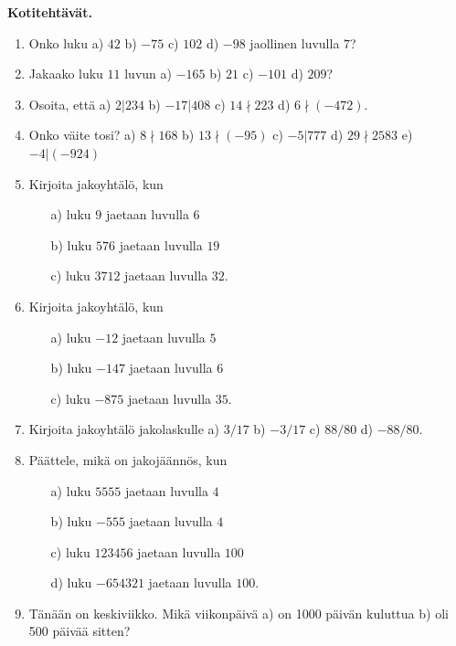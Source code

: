 {\bf Kotitehtävät.}

\begin{enumerate}

\item Onko luku a) $42$ b) $-75$ c) $102$ d) $-98$ jaollinen luvulla $7$?

\item Jakaako luku $11$ luvun a) $-165$ b) $21$ c) $-101$ d) $209$?

\item Osoita, että a) $2|234$ b) $-17|408$ c) $14 \nmid 223$ d) $6 \nmid (-472)$.

\item Onko väite tosi? a) $8 \nmid 168$ b) $13 \nmid (-95)$ c) $-5|777$ d) $29\nmid 2583$ e) $-4|(-924)$

\item Kirjoita jakoyhtälö, kun
\begin{itemize}
\item[a)] luku $9$ jaetaan luvulla $6$
\item[b)] luku $576$ jaetaan luvulla $19$
\item[c)] luku $3712$ jaetaan luvulla $32$.
\end{itemize}

\item Kirjoita jakoyhtälö, kun
\begin{itemize}
\item[a)] luku $-12$ jaetaan luvulla $5$
\item[b)] luku $-147$ jaetaan luvulla $6$
\item[c)] luku $-875$ jaetaan luvulla $35$.
\end{itemize}

\item Kirjoita jakoyhtälö jakolaskulle a) $3/17$ b) $-3/17$ c) $88/80$ d) $-88/80$.

\item Päättele, mikä on jakojäännös, kun
\begin{itemize}
\item[a)] luku $5555$ jaetaan luvulla $4$
\item[b)] luku $-555$ jaetaan luvulla $4$
\item[c)] luku $123456$ jaetaan luvulla $100$
\item[d)] luku $-654321$ jaetaan luvulla $100$.
\end{itemize}

\item Tänään on keskiviikko. Mikä viikonpäivä a) on 1000 päivän kuluttua b) oli 500 päivää sitten?


\end{enumerate}
